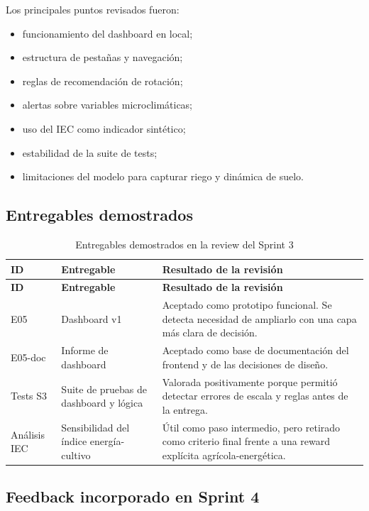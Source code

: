 \documentclass[11pt,a4paper]{article}
\begin{document}
Los principales puntos revisados fueron:

\begin{itemize}
    \item funcionamiento del dashboard en local;
    \item estructura de pestañas y navegación;
    \item reglas de recomendación de rotación;
    \item alertas sobre variables microclimáticas;
    \item uso del IEC como indicador sintético;
    \item estabilidad de la suite de tests;
    \item limitaciones del modelo para capturar riego y dinámica de suelo.
\end{itemize}

\subsection{Entregables demostrados}

\begin{longtable}{p{}p{}p{}}
\caption{Entregables demostrados en la review del Sprint 3}\\
\toprule
\textbf{ID} & \textbf{Entregable} & \textbf{Resultado de la revisión} \\
\midrule
\endfirsthead
\toprule
\textbf{ID} & \textbf{Entregable} & \textbf{Resultado de la revisión} \\
\midrule
\endhead
E05 & Dashboard v1 & Aceptado como prototipo funcional. Se detecta necesidad de ampliarlo con una capa más clara de decisión. \\
E05-doc & Informe de dashboard & Aceptado como base de documentación del frontend y de las decisiones de diseño. \\
Tests S3 & Suite de pruebas de dashboard y lógica & Valorada positivamente porque permitió detectar errores de escala y reglas antes de la entrega. \\
Análisis IEC & Sensibilidad del índice energía-cultivo & Útil como paso intermedio, pero retirado como criterio final frente a una reward explícita agrícola-energética. \\
\bottomrule
\end{longtable}

\subsection{Feedback incorporado en Sprint 4}
\end{document}
